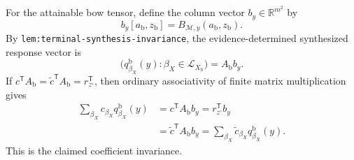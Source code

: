 For the attainable bow tensor, define the column vector \(b_y\in\mathbb R^{m^2}\) by
\[
 b_y[a_{\mathrm b},z_{\mathrm b}]=B_{\mathcal M,y}(a_{\mathrm b},z_{\mathrm b}).
\]
By \texttt{lem:terminal-synthesis-invariance}, the evidence-determined synthesized response vector is
\[
 \bigl(q^{\mathrm b}_{\beta_X}(y):\beta_X\in\mathcal L_{X_{\mathrm b}}\bigr)
 =A_{\mathrm b}b_y.
\]
If \(c^{\mathsf T}A_{\mathrm b}=\widetilde c^{\mathsf T}A_{\mathrm b}=r_{z^{\circ}}^{\mathsf T}\), then ordinary associativity of finite matrix multiplication gives
\[
\begin{aligned}
 \sum_{\beta_X}c_{\beta_X}q^{\mathrm b}_{\beta_X}(y)
 &=c^{\mathsf T}A_{\mathrm b}b_y
 =r_{z^{\circ}}^{\mathsf T}b_y\\
 &=\widetilde c^{\mathsf T}A_{\mathrm b}b_y
 =\sum_{\beta_X}\widetilde c_{\beta_X}q^{\mathrm b}_{\beta_X}(y).
\end{aligned}
\]
This is the claimed coefficient invariance.